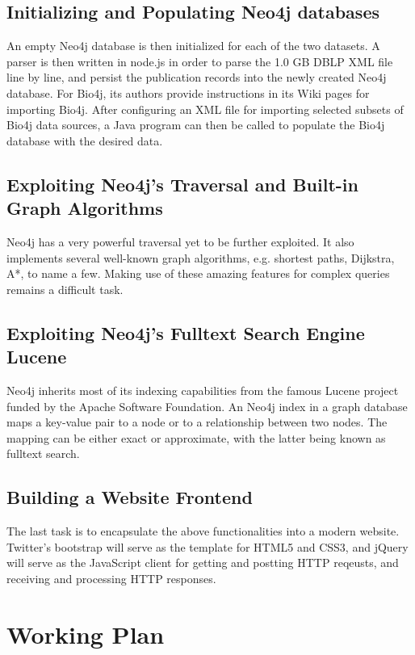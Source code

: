 \documentclass[10pt, conference, compsocconf]{../IEEEtran}
\begin{document}
\subsection{Initializing and Populating Neo4j databases}

An empty Neo4j database is then initialized for each of the two datasets. A parser is then written in node.js in order to parse the 1.0 GB DBLP XML file line by line, and persist the publication records into the newly created Neo4j database. For Bio4j, its authors provide instructions in its Wiki pages for importing Bio4j. After configuring an XML file for importing selected subsets of Bio4j data sources, a Java program can then be called to populate the Bio4j database with the desired data.

\subsection{Exploiting Neo4j's Traversal and Built-in Graph Algorithms}

Neo4j has a very powerful traversal yet to be further exploited. It also implements several well-known graph algorithms, e.g. shortest paths, Dijkstra, A*, to name a few. Making use of these amazing features for complex queries remains a difficult task.

\subsection{Exploiting Neo4j's Fulltext Search Engine Lucene}

Neo4j inherits most of its indexing capabilities from the famous Lucene project funded by the Apache Software Foundation. An Neo4j index in a graph database maps a key-value pair to a node or to a relationship between two nodes. The mapping can be either exact or approximate, with the latter being known as fulltext search.

\subsection{Building a Website Frontend}

The last task is to encapsulate the above functionalities into a modern website. Twitter's bootstrap will serve as the template for HTML5 and CSS3, and jQuery will serve as the JavaScript client for getting and postting HTTP reqeusts, and receiving and processing HTTP responses.

\section{Working Plan}
\end{document}
